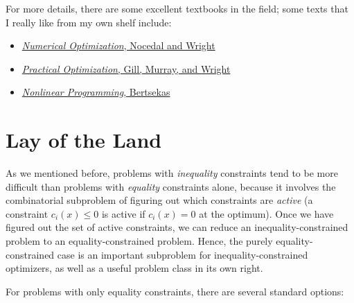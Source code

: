 \documentclass[12pt, leqno]{article} %
\providecommand{\tightlist}{%
  \setlength{\itemsep}{0pt}\setlength{\parskip}{0pt}}
\begin{document}
For more details, there are some excellent textbooks in the field; some
texts that I really like from my own shelf include:

\begin{itemize}
\tightlist
\item
  \href{https://link.springer.com/book/10.1007/978-0-387-40065-5}{\emph{Numerical
  Optimization}, Nocedal and Wright}
\item
  \href{https://doi.org/10.1137/1.9781611975604}{\emph{Practical
  Optimization}, Gill, Murray, and Wright}
\item
  \href{http://www.athenasc.com/nonlinbook.html}{\emph{Nonlinear
  Programming}, Bertsekas}
\end{itemize}

\section{Lay of the Land}

As we mentioned before, problems with \emph{inequality} constraints tend
to be more difficult than problems with \emph{equality} constraints
alone, because it involves the combinatorial subproblem of figuring out
which constraints are \emph{active} (a constraint \(c_i(x) \leq 0\) is
active if \(c_i(x) = 0\) at the optimum). Once we have figured out the
set of active constraints, we can reduce an inequality-constrained
problem to an equality-constrained problem. Hence, the purely
equality-constrained case is an important subproblem for
inequality-constrained optimizers, as well as a useful problem class in
its own right.

For problems with only equality constraints, there are several standard
options:
\end{document}
